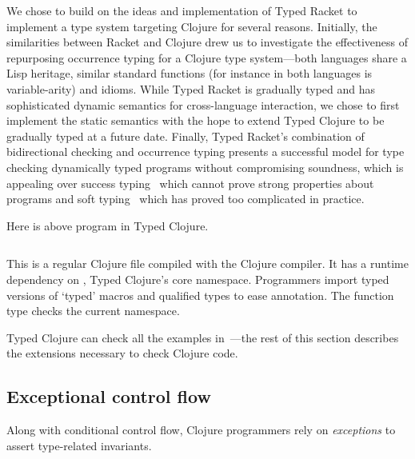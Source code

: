 We chose to build on the ideas and implementation
of Typed Racket to implement a type system targeting Clojure for several reasons.
Initially, the similarities between Racket and Clojure drew us to
investigate the effectiveness of repurposing occurrence typing
for a Clojure type system---both languages share a Lisp heritage,
similar standard functions 
(for instance 
in both languages is variable-arity)
and idioms.
While Typed Racket is gradually typed and has sophisticated
dynamic semantics for cross-language interaction, we 
chose to first implement
the static semantics
with the hope to extend Typed Clojure to be gradually typed at a future date.
Finally,
Typed Racket's combination of bidirectional checking
and occurrence typing presents a successful model for 
type checking dynamically typed programs without compromising
soundness, which is appealing over success typing~\cite{todo-dialyzer-paper}
which cannot prove strong properties about programs
and soft typing~\cite{successtyping-todo}
which has proved too complicated in practice.

Here is above program in Typed Clojure.

\begin{exmp}
\inputminted[firstline=1]{clojure}{code/demo/src/demo/eg1.clj}
\label{example:conditionalflow}
\end{exmp}

This is a regular Clojure file compiled with
the Clojure compiler. It has a
runtime dependency 
on
,
Typed Clojure's core namespace.
Programmers import typed versions of `typed' macros and qualified types to ease annotation.
The  function type checks the current namespace.

Typed Clojure can check all the examples in~\citet{TF10}---the 
rest of this section describes the extensions necessary
to check Clojure code.

\subsection{Exceptional control flow}

Along with conditional control flow,
Clojure programmers rely on \emph{exceptions}
to assert type-related invariants.

\begin{exmp}
\inputminted[firstline=13,lastline=15]{clojure}{code/demo/src/demo/do.clj}
\label{example:doexception}
\end{exmp}

